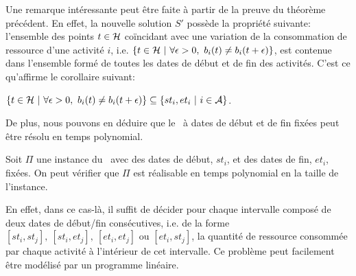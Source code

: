 Une remarque intéressante peut être faite à partir de la preuve du
théorème précédent. En effet, la nouvelle solution $S'$ possède la
propriété suivante: l'ensemble des points $t \in {\cal H}$ coïncidant avec
une variation de la consommation de ressource d'une activité $i$,
i.e. $\{t \in \H \ |\ \forall \epsilon>0,\ b_i(t) \neq b_i(t+\epsilon)\}$,
est contenue dans l'ensemble formé de toutes les dates de début et de
fin des activités. C'est ce qu'affirme le corollaire suivant: 

\begin{coro}
$\{t \in \H \ |\ \forall \epsilon>0,\ b_i(t) \neq b_i(t+\epsilon)\}
\subseteq \{st_i,et_i\ |\ i \in \A \}$.
\end{coro}

De plus, nous pouvons en déduire que le \CECSP~à dates de début et de
fin fixées peut être résolu en temps polynomial. 

\begin{prop}
Soit $\Pi$ une instance du \CECSP~avec des dates de début, $st_i$, et
des dates de fin, $et_i$, fixées. On peut vérifier que $\Pi$ est réalisable en temps 
polynomial en la taille de l'instance. 
\end{prop}

En effet, dans ce cas-là, il suffit de décider pour chaque intervalle
composé de deux dates de début/fin consécutives, i.e. de la forme
$[st_i,st_j],\ [st_i,et_j],\ [et_i,et_j]$ ou $[et_i,st_j]$, la
quantité de ressource consommée par chaque activité à l'intérieur de
cet intervalle. Ce problème peut facilement être modélisé par un
programme linéaire.

